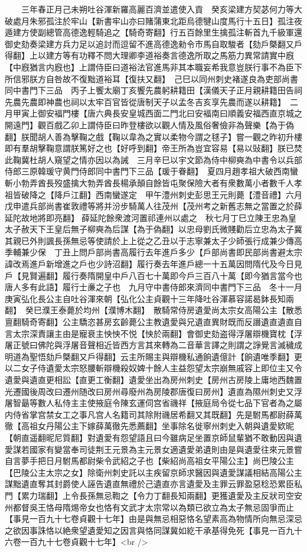 　　三年春正月己未朔吐谷渾新羅高麗百濟並遣使入貢　癸亥梁建方契苾何力等大破處月朱邪孤注於牢山【新書牢山亦曰賭蒲東北距烏德犍山度馬行十五日】孤注夜遁建方使副總管高德逸輕騎追之【騎奇寄翻】行五百餘里生擒孤注斬首九千級軍還御史劾奏梁建方兵力足以追討而逗留不進高德逸勑令市馬自取駿者【劾戶槩翻又戶得翻】上以建方等有功釋不問大理卿李道裕奏言德逸所取之馬筋力異常請實中廐【中廐猶言内廐也】上謂侍臣曰道裕法官進馬非其本職妄希我意豈朕行事不為臣下所信邪朕方自咎故不復黜道裕耳【復扶又翻】　己巳以同州刺史褚遂良為吏部尚書同中書門下三品　丙子上饗太廟丁亥饗先農躬耕籍田【漢儀天子正月親耕籍田告祠先農先農即神農也祠以太牢百官皆從唐制天子以孟冬吉亥享先農而遂以耕籍】　二月甲寅上御安褔門樓【唐六典長安皇城西面二門北曰安褔南曰順義安福西直京城之開遠門】觀百戲乙卯上謂侍臣曰昨登樓欲以觀人情及風俗奢儉非為聲樂【為于偽翻】朕聞胡人善為擊鞠之戲【鞠以韋為之實以柔物今謂之毬子】嘗一觀之昨初升樓即有羣胡擊鞠意謂朕篤好之也【好呼到翻】帝王所為豈宜容易【易以䜴翻】朕已焚此鞠冀杜胡人窺望之情亦因以為誡　三月辛巳以宇文節為侍中柳奭為中書令以兵部侍郎三原韓瑗守黄門侍郎同中書門下三品【瑗于眷翻】　夏四月趙孝祖大破西南蠻斬小勃弄酋長歿盛擒大勃弄酋長楊承顛自餘皆屯聚保險大者有衆數萬小者數千人孝祖皆破降之【降戶江翻】西南蠻遂定　甲午澧州刺史彭思王元則薨【澧音禮】六月戊申遣兵部尚書崔敦禮等將并汾步騎萬人往茂州【茂州考之新舊志無之當置之於薛延陀故地將即亮翻】薛延陀餘衆渡河置祁連州以處之　秋七月丁巳立陳王忠為皇太子赦天下王皇后無子柳奭為后謀【為于偽翻】以忠母劉氏微賤勸后立忠為太子冀其親已外則諷長孫無忌等使請於上上從之乙丑以于志寧兼太子少師張行成兼少傳高季輔兼少保　丁丑上問戶部尚書高履行去年進戶多少【戶部尚書即民部尚書避太宗諱改焉進戶新增進之戶也少詩沼翻】履行奏去年進戶總一十五萬因問隋代及今日見戶【見賢遍翻】履行奏隋開皇中戶八百七十萬即今戶三百八十萬【即今猶言當今也唐人多有此語】履行士亷之子也　九月守中書侍郎來濟同中書門下三品　冬十一月庚寅弘化長公主自吐谷渾來朝【弘化公主貞觀十三年降吐谷渾慕容諾曷鉢長知兩翻】　癸巳濮王泰薨於均州【濮博木翻】　散騎常侍房遺愛尚太宗女高陽公主【散悉亶翻騎奇寄翻】公主驕恣甚房玄齡薨公主教遺愛與兄遺直異財既而反譖遺直遺直自言太宗深責讓主由是寵衰主怏怏不悦【怏於兩翻】會御史劾盗得浮屠辯機寶枕【浮屠正號曰佛陀與浮屠音聲相近皆西方言其來轉為二音華言譯之則謂之諍覺言滅穢成明道為聖悟劾戶槩翻又戶得翻】云主所賜主與辯機私通餉遺億計【餉遺唯季翻】更以二女子侍遺愛太宗怒腰斬辯機殺奴婢十餘人主益怨望太宗崩無戚容上即位主又令遺愛與遺直更相訟【直更工衡翻】遺愛坐出為房州刺史【房州古房陵上庸地西魏置光遷國後周改曰遷州随改曰房州尋廢州為房陵郡唐復曰房州】遺直為隰州刺史又浮屠智朂等數人私侍主主使掖庭令陳玄運伺宫省禨祥【掖庭局令從七品下官者為之屬内侍省掌宫禁女工之事凡宫人名籍司其除附禨居希翻又其既翻】先是駙馬都尉薛萬徹【高祖女丹陽公主下嫁薛萬徹先悉薦翻】坐事除名徙寧州刺史入朝與遺愛欵昵【朝直遥翻昵尼質翻】對遺愛有怨望語且曰今雖病足坐置京師鼠輩猶不敢動因與遺愛謀若國家有變當奉司徒荆王元景為主元景女適遺愛弟遺則由是與遺愛往來元景嘗自言夢手把日月駙馬都尉柴令武紹之子也【柴紹尚高祖女平陽公主】尚巴陵公主【巴陵公主太宗之女】除衛州刺史託以主疾留京師求醫因與遺愛謀議相結高陽公主謀黜遺直奪其封爵使人誣告遺直無禮於己遺直亦言遺愛及主罪云罪盈惡稔恐累臣私門【累力瑞翻】上令長孫無忌鞫之【令力丁翻長知兩翻】更獲遺愛及主反狀司空安州都督吳王恪母隋焬帝女也恪有文武才太宗常以為類已欲立為太子無忌固爭而止【事見一百九十七卷貞觀十七年】由是與無忌相惡恪名望素高為物情所向無忌深忌之欲因事誅恪以絶衆望遺愛知之因言與恪同謀冀如紇干承基得免死【事見一百九十六卷一百九十七卷貞觀十七年】<br />
